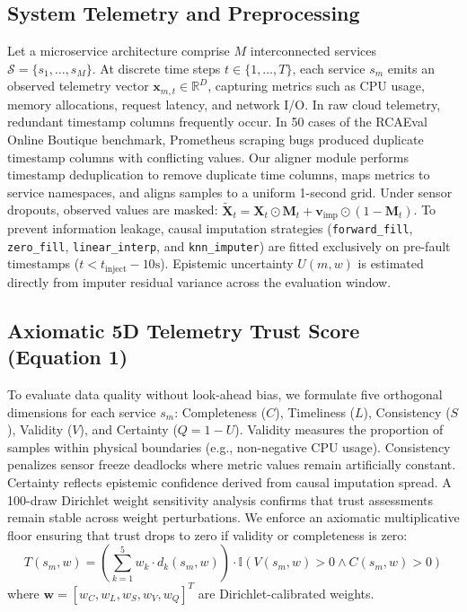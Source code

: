 \documentclass[conference]{IEEEtran}
\begin{document}
\subsection{System Telemetry and Preprocessing}
Let a microservice architecture comprise $M$ interconnected services $\mathcal{S} = \{s_1, \dots, s_M\}$.
At discrete time steps $t \in \{1, \dots, T\}$, each service $s_m$ emits an observed telemetry vector $\mathbf{x}_{m,t} \in \mathbb{R}^{D}$, capturing metrics such as CPU usage, memory allocations, request latency, and network I/O.
In raw cloud telemetry, redundant timestamp columns frequently occur.
In 50 cases of the RCAEval Online Boutique benchmark, Prometheus scraping bugs produced duplicate timestamp columns with conflicting values.
Our aligner module performs timestamp deduplication to remove duplicate time columns, maps metrics to service namespaces, and aligns samples to a uniform 1-second grid.
Under sensor dropouts, observed values are masked: $\tilde{\mathbf{X}}_t = \mathbf{X}_t \odot \mathbf{M}_t + \mathbf{v}_{\text{imp}} \odot (1 - \mathbf{M}_t)$.
To prevent information leakage, causal imputation strategies (\texttt{forward\_fill}, \texttt{zero\_fill}, \texttt{linear\_interp}, and \texttt{knn\_imputer}) are fitted exclusively on pre-fault timestamps ($t < t_{\text{inject}} - 10\text{s}$).
Epistemic uncertainty $U(m, w)$ is estimated directly from imputer residual variance across the evaluation window.

\subsection{Axiomatic 5D Telemetry Trust Score (Equation 1)}
To evaluate data quality without look-ahead bias, we formulate five orthogonal dimensions for each service $s_m$: Completeness ($C$), Timeliness ($L$), Consistency ($S$), Validity ($V$), and Certainty ($Q = 1 - U$).
Validity measures the proportion of samples within physical boundaries (e.g., non-negative CPU usage).
Consistency penalizes sensor freeze deadlocks where metric values remain artificially constant.
Certainty reflects epistemic confidence derived from causal imputation spread.
A 100-draw Dirichlet weight sensitivity analysis confirms that trust assessments remain stable across weight perturbations.
We enforce an axiomatic multiplicative floor ensuring that trust drops to zero if validity or completeness is zero:
\begin{equation}
T(s_m, w) = \left( \sum_{k=1}^5 w_k \cdot d_k(s_m, w) \right) \cdot \mathbb{I}(V(s_m, w) > 0 \land C(s_m, w) > 0)
\label{eq:trust}
\end{equation}
where $\mathbf{w} = [w_C, w_L, w_S, w_V, w_Q]^T$ are Dirichlet-calibrated weights.
\end{document}
